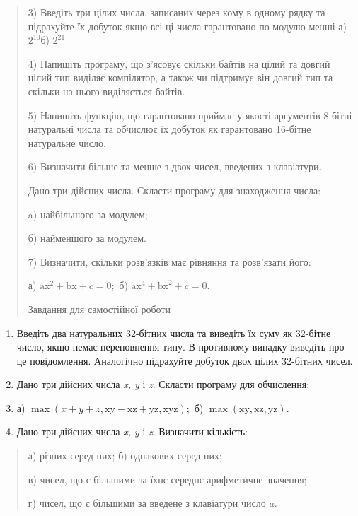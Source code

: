 \documentclass[]{article}
\begin{document}
\begin{quote}
3) Введіть три цілих числа, записаних через кому в одному рядку та
підрахуйте їх добуток якщо всі ці числа гарантовано по модулю менші а)
\(2^{10}\)б) \(2^{21}\)

4) Напишіть програму, що з'ясовує скільки байтів на цілий та довгий
цілий тип виділяє компілятор, а також чи підтримує він довгий тип та
скільки на нього виділяється байтів.

5) Напишіть функцію, що гарантовано приймає у якості аргументів 8-бітні
натуральні числа та обчислює їх добуток як гарантовано 16-бітне
натуральне число.

6) Визначити більше та менше з двох чисел, введених з клавіатури.

Дано три дійсних числа. Скласти програму для знаходження числа:

a) найбільшого за модулем;

б) найменшого за модулем.

7) Визначити, скільки розв'язків має рівняння та розв'язати його:

а) \(\mathrm{\text{ax}}^{2} + \mathrm{\text{bx}} + c = 0;\) б)
\(\mathrm{\text{ax}}^{4} + \mathrm{\text{bx}}^{2} + c = 0\mathrm{.}\)

Завдання для самостійної роботи
\end{quote}

\begin{enumerate}
\def\labelenumi{\arabic{enumi})}
\setcounter{enumi}{7}
\item
  Введіть два натуральних 32-бітних числа та виведіть їх суму як
  32-бітне число, якщо немає переповнення типу. В противному випадку
  виведіть про це повідомлення. Аналогічно підрахуйте добуток двох цілих
  32-бітних чисел.
\item
  Дано три дійсних числа \emph{x, y} і \emph{z}. Скласти програму для
  обчислення:
\item
  а)
  \(\mathrm{\max}(x + y + z,\mathrm{\text{xy}} - \mathrm{\text{xz}} + \mathrm{\text{yz}},\mathrm{\text{xyz}});\)
  б)
  \(\mathrm{\max}(\mathrm{\text{xy}},\mathrm{\text{xz}},\mathrm{\text{yz}})\mathrm{.}\)
\item
  Дано три дійсних числа \emph{x, y} і \emph{z}. Визначити кількість:
\end{enumerate}

\begin{quote}
а) різних серед них; б) однакових серед них;

в) чисел, що є більшими за їхнє середнє арифметичне значення;

г) чисел, що є більшими за введене з клавіатури число \(a\).
\end{quote}
\end{document}
